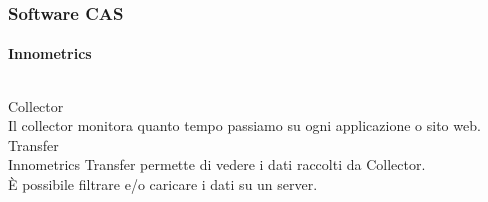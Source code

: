 \documentclass{beamer}
\begin{document}

\begin{frame}
\frametitle{Software CAS}
\framesubtitle{Innometrics}
\begin{columns}
Collector\\
Il collector monitora quanto tempo passiamo su ogni applicazione o sito web.
Transfer\\
Innometrics Transfer permette di vedere i dati raccolti da Collector.\\
È possibile filtrare e/o caricare i dati su un server.
\end{columns}
\end{frame}
\end{document}
